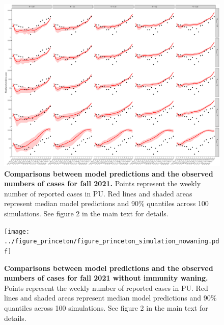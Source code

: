 \documentclass[12pt]{article}
\begin{document}
\begin{figure}[!htp]
\includegraphics[width=\textwidth]{../figure_princeton_new/figure_princeton_simulation_fall_2021_all.pdf}
\caption{
\textbf{Comparisons between model predictions and the observed numbers of cases for fall 2021.}
Points represent the weekly number of reported cases in PU.
Red lines and shaded areas represent median model predictions and 90\% quantiles across 100 simulations.
See figure 2 in the main text for details.
}
\end{figure}

\pagebreak

\begin{figure}[!htp]
\texttt{[image: ../figure\_princeton/figure\_princeton\_simulation\_nowaning.pdf]}
\caption{
\textbf{Comparisons between model predictions and the observed numbers of cases for fall 2021 without immunity waning.}
Points represent the weekly number of reported cases in PU.
Red lines and shaded areas represent median model predictions and 90\% quantiles across 100 simulations.
See figure 2 in the main text for details.
}
\end{figure}
\end{document}
